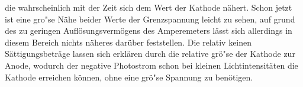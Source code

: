 die wahrscheinlich mit der Zeit sich dem Wert der Kathode nähert.
 Schon jetzt ist eine gro"se Nähe beider Werte der Grenzspannung leicht zu sehen, 
 auf grund des zu geringen Auflösungsvermögens des Amperemeters lässt sich allerdings in diesem Bereich nichts
  näheres darüber feststellen. Die relativ keinen Sättigungsbeträge lassen sich erklären durch die relative grö"se der Kathode zur Anode,
   wodurch der negative Photostrom schon bei kleinen Lichtintensitäten die Kathode erreichen können, 
   ohne eine grö"se Spannung zu benötigen. 












